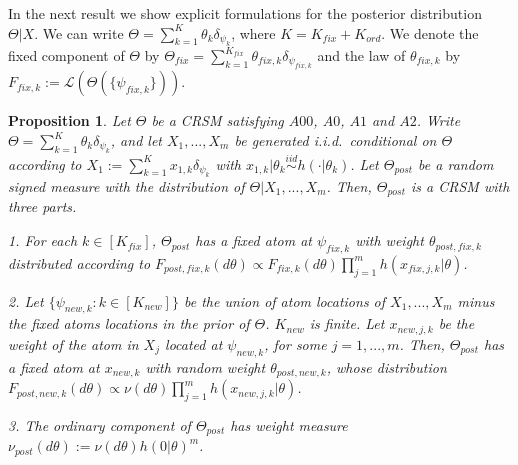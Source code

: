 \documentclass{article}
\theoremstyle{plain}
\newtheorem{proposition}[theorem]{Proposition}
\theoremstyle{remark}
\begin{document}
In the next result we show explicit formulations for the posterior distribution $\Theta|X$. We can write $\Theta=\sum_{k=1}^{K}\theta_{k}\delta_{\psi_{k}}$, where $K=K_{fix}+K_{ord}$. We denote the fixed component of $\Theta$ by $\Theta_{fix}=\sum_{k=1}^{K_{fix}}\theta_{fix,k}\delta_{\psi_{fix,k}}$ and the law of $\theta_{fix,k}$ by $F_{fix,k}:=\mathcal{L}(\Theta(\{\psi_{fix,k}\}))$.
\begin{proposition}\label{pro-Bay}
	Let $\Theta$ be a CRSM satisfying $A00$, $A0$, $A1$ and $A2$. Write $\Theta=\sum_{k=1}^{K}\theta_{k}\delta_{\psi_{k}}$, and let $X_{1}, . . . , X_{m}$ be generated i.i.d.~conditional on $\Theta$ according to $X_{1}:=\sum_{k=1}^{K}x_{1,k}\delta_{\psi_{k}}$ with $x_{1,k}|\theta_k\stackrel{iid}{\sim} h(\cdot|\theta_{k})$. Let $\Theta_{post}$ be a random signed measure with the distribution of $\Theta|X_1,...,X_m$. Then, $\Theta_{post}$ is a CRSM with three parts.
	
	\textnormal{1.} For each $k\in [K_{fix}]$, $\Theta_{post}$ has a fixed atom at $\psi_{fix,k}$ with weight $\theta_{post,fix,k}$ distributed according to $F_{post,fix,k} (d\theta)\propto F_{fix,k} (d\theta)\prod_{j=1}^{m}h(x_{fix,j,k}|\theta)$.
	
	\textnormal{2.} Let $\{\psi_{new,k}: k \in [K_{new} ]\}$ be the union of atom locations of $X_1,...,X_m$ minus the
	fixed atoms locations in the prior of $\Theta$. $K_{new}$ is finite. Let $x_{new,j,k}$ be the weight of the atom in $X_{j}$ located at $\psi_{new,k}$, for some $j=1,...,m$. Then, $\Theta_{post}$ has a fixed atom at $x_{new,k}$ with	random weight $\theta_{post,new,k}$, whose distribution $F_{post,new,k}(d\theta)\varpropto\nu(d\theta)\prod_{j=1}^{m}h(x_{new,j,k}|\theta)$.
	
	\textnormal{3.} The ordinary component of $\Theta_{post}$ has weight measure $\nu_{post}(d\theta):=\nu(d\theta)h(0|\theta)^m$.
\end{proposition}
\end{document}
